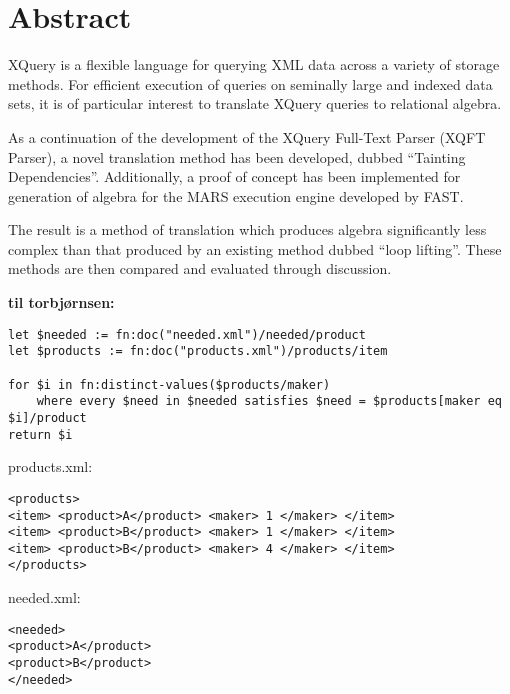 \chapter*{Abstract}
XQuery is a flexible language for querying XML data across a variety of storage
methods. For efficient execution of queries on seminally large and indexed data
sets, it is of particular interest to translate XQuery queries to relational
algebra.

As a continuation of the development of the XQuery Full-Text Parser (XQFT
Parser)\cite{ourselves}, a novel translation method has been developed, dubbed
``Tainting Dependencies''. Additionally, a proof of concept has been
implemented for generation of algebra for the MARS execution engine developed
by FAST.

The result is a method of translation which produces algebra significantly less
complex than that produced by an existing method dubbed ``loop lifting''. These
methods are then compared and evaluated through discussion.

\textbf{\LARGE til torbj\o rnsen:}
\begin{verbatim}
let $needed := fn:doc("needed.xml")/needed/product
let $products := fn:doc("products.xml")/products/item

for $i in fn:distinct-values($products/maker) 
    where every $need in $needed satisfies $need = $products[maker eq $i]/product
return $i

\end{verbatim}

products.xml:
\begin{verbatim}
<products>
<item> <product>A</product> <maker> 1 </maker> </item>
<item> <product>B</product> <maker> 1 </maker> </item>
<item> <product>B</product> <maker> 4 </maker> </item>
</products>
\end{verbatim}

needed.xml:
\begin{verbatim}
<needed>
<product>A</product>
<product>B</product>
</needed>
\end{verbatim}